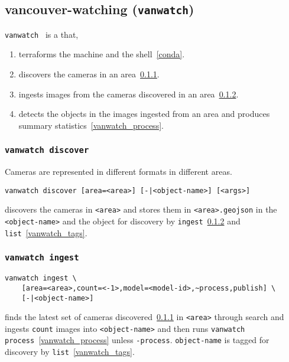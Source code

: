 \subsection{vancouver-watching (\texttt{vanwatch})}
\label{vanwatch}

\texttt{vanwatch}~ is a  that,
%
\begin{enumerate}
    \item{terraforms the machine and the shell~\ref{conda}.}
    \item{discovers the cameras in an area~\ref{vanwatch_discover}.}
    \item{ingests images from the cameras discovered in an area~\ref{vanwatch_ingest}.}
    \item{detects the objects in the images ingested from an area and produces summary statistics~\ref{vanwatch_process}.}
\end{enumerate}

\subsubsection{\texttt{vanwatch discover}}
\label{vanwatch_discover}

Cameras are represented in different formats in different areas.
%
\begin{verbatim}
vanwatch discover [area=<area>] [-|<object-name>] [<args>]
\end{verbatim}
%
discovers the cameras in \texttt{<area>} and stores them in \texttt{<area>.geojson} in the  \texttt{<object-name>} and  the object for discovery by \texttt{ingest}~\ref{vanwatch_ingest} and \texttt{list}~\ref{vanwatch_tags}. 

\subsubsection{\texttt{vanwatch ingest}}
\label{vanwatch_ingest}

\begin{verbatim}
vanwatch ingest \
    [area=<area>,count=<-1>,model=<model-id>,~process,publish] \
    [-|<object-name>]
\end{verbatim}
%
finds the latest set of cameras discovered~\ref{vanwatch_discover} in \texttt{<area>} through  search and ingests \texttt{count} images into \texttt{<object-name>} and then runs \texttt{vanwatch process}~\ref{vanwatch_process} unless \texttt{-process}. \texttt{object-name} is tagged for discovery by \texttt{list}~\ref{vanwatch_tags}. 

